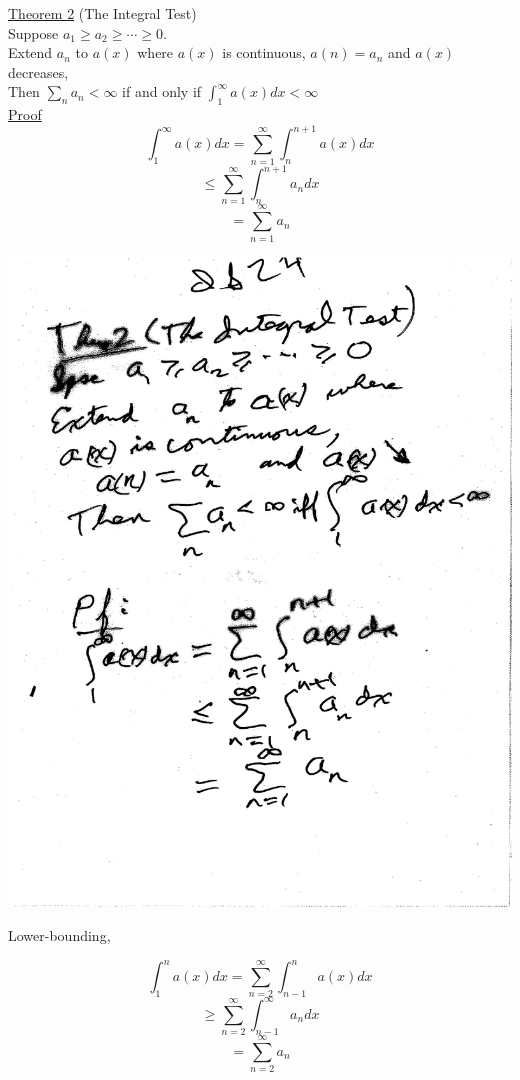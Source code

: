 \documentclass[10pt,a4paper]{article}
\begin{document}
{{\noindent \underline{Theorem 2} (The Integral Test)
\vspace{5mm}
\\ Suppose $a_1 \geq a_2 \geq \cdots \geq 0$.
\\ Extend $a_n$ to $a(x)$ where $a(x)$ is continuous,
$a(n) = a_n$ and $a(x)$ decreases,
\\ Then $\sum_n a_n < \infty$ if and only if $\int_{1}^{\infty} a(x) dx < \infty$
\vspace{5mm}
\\ \underline{Proof}
$$\int_{1}^{\infty} a(x) dx = \sum_{n=1}^{\infty} \int_{n}^{n+1} a(x) dx$$
$$ \leq \sum_{n=1}^{\infty} \int_{n}^{n+1} a_n dx$$
$$ = \sum_{n=1}^{\infty} a_n $$

\includegraphics[scale=.5]{Pages/IS_24}

\newpage

\noindent Lower-bounding,

$$ \int_{1}^{n} a(x) dx = \sum_{n=2}^{\infty} \int_{n-1}^{n} a(x) dx$$
$$ \geq \sum_{n=2}^{\infty} \int_{n-1}^{\infty} a_n dx $$
$$ = \sum_{n=2}^{\infty} a_n$$

}}
\end{document}
